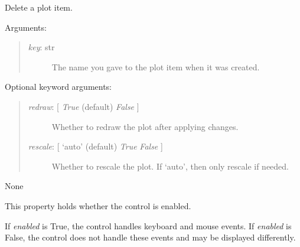 \documentclass[letterpaper,10pt,english]{sphinxmanual}
\begin{document}
\begin{fulllineitems}

\begin{fulllineitems}
\label{api:controls.Plot2D.delete}
Delete a plot item.

Arguments:
\begin{quote}
\begin{description}
\item[{\emph{key}: str}] \leavevmode
The name you gave to the plot item when it was created.

\end{description}
\end{quote}

Optional keyword arguments:
\begin{quote}
\begin{description}
\item[{\emph{redraw}: {[} \emph{True}  (default) \textbar{} \emph{False} {]}}] \leavevmode
Whether to redraw the plot after applying changes.

\item[{\emph{rescale}: {[} `auto' (default) \textbar{} \emph{True} \textbar{} \emph{False} {]}}] \leavevmode
Whether to rescale the plot. If `auto', then only rescale if needed.

\end{description}
\end{quote}

\end{fulllineitems}


\begin{fulllineitems}
\label{api:controls.Plot2D.draw_action}
None

\end{fulllineitems}


\begin{fulllineitems}
\label{api:controls.Plot2D.enabled}
This property holds whether the control is enabled.

If \emph{enabled} is True, the control handles keyboard and mouse events.
If \emph{enabled} is False, the control does not handle these events and may
be displayed differently.


\end{fulllineitems}
\end{fulllineitems}
\end{document}
